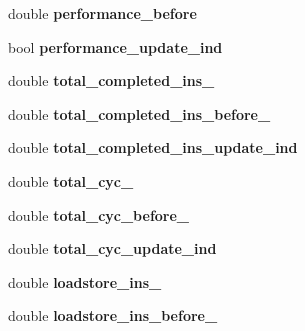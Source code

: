 \begin{DoxyCompactItemize}
\item 
\hypertarget{structthread__info_a2c1f353fb49af85e9db3bc21a0f5f380}{double {\bfseries performance\-\_\-before}}\label{structthread__info_a2c1f353fb49af85e9db3bc21a0f5f380}

\item 
\hypertarget{structthread__info_a8b4b8853ce7597c9ed5bd1448ed7b2c4}{bool {\bfseries performance\-\_\-update\-\_\-ind}}\label{structthread__info_a8b4b8853ce7597c9ed5bd1448ed7b2c4}

\item 
\hypertarget{structthread__info_ad4b9a480cc4beddcfb80a664c1aa7ba4}{double {\bfseries total\-\_\-completed\-\_\-ins\-\_\-}}\label{structthread__info_ad4b9a480cc4beddcfb80a664c1aa7ba4}

\item 
\hypertarget{structthread__info_a7dff0b5704cc60fcbb3e92f54581e5c5}{double {\bfseries total\-\_\-completed\-\_\-ins\-\_\-before\-\_\-}}\label{structthread__info_a7dff0b5704cc60fcbb3e92f54581e5c5}

\item 
\hypertarget{structthread__info_a444e412a11cb84bb03901b9eab3f7eed}{double {\bfseries total\-\_\-completed\-\_\-ins\-\_\-update\-\_\-ind}}\label{structthread__info_a444e412a11cb84bb03901b9eab3f7eed}

\item 
\hypertarget{structthread__info_a1b6ab4c152f5e5e8e7d99d52df517775}{double {\bfseries total\-\_\-cyc\-\_\-}}\label{structthread__info_a1b6ab4c152f5e5e8e7d99d52df517775}

\item 
\hypertarget{structthread__info_a4bc7fe0e607b24de715ca0ea728c06c0}{double {\bfseries total\-\_\-cyc\-\_\-before\-\_\-}}\label{structthread__info_a4bc7fe0e607b24de715ca0ea728c06c0}

\item 
\hypertarget{structthread__info_a45195095e8c184c2da0e14d8b17184d9}{double {\bfseries total\-\_\-cyc\-\_\-update\-\_\-ind}}\label{structthread__info_a45195095e8c184c2da0e14d8b17184d9}

\item 
\hypertarget{structthread__info_a71da91228de8a177cd151a41bfb2c4e6}{double {\bfseries loadstore\-\_\-ins\-\_\-}}\label{structthread__info_a71da91228de8a177cd151a41bfb2c4e6}

\item 
\hypertarget{structthread__info_a9895b3c388d68bbf318146660f9521b3}{double {\bfseries loadstore\-\_\-ins\-\_\-before\-\_\-}}\label{structthread__info_a9895b3c388d68bbf318146660f9521b3}


\end{DoxyCompactItemize}
